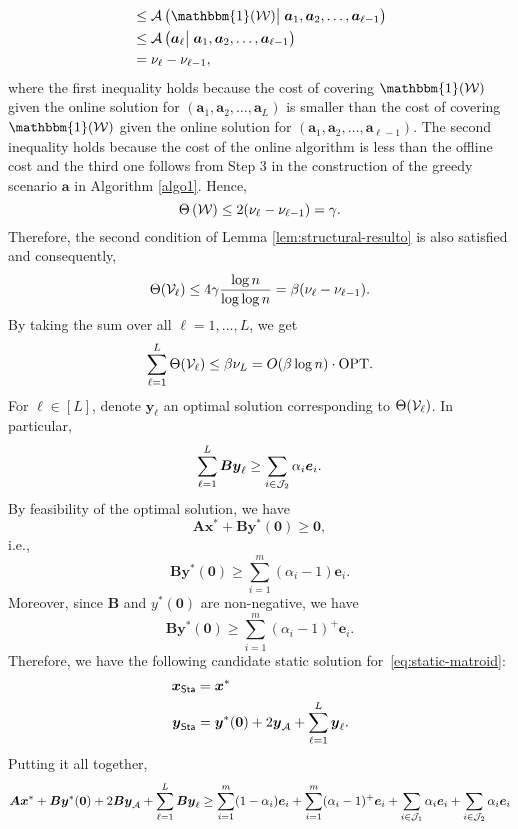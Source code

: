 \documentclass[moor]{informs1}              %
\newcommand{\opt}{\mathrm{OPT}}
\newcommand{\mb}[1]{\ensuremath{\boldsymbol{#1}}}
\begin{document}
{\begin{align*}
&\leq { {\cal A} }\left( \mathbbm{1}({\cal W})  \big\vert \; \mb a_1, \mb a_2, \ldots , \mb a_{\ell-1} \right) \\
&\leq { {\cal A} }\left( \mb  a_{\ell}  \big\vert \; \mb a_1, \mb a_2, \ldots , \mb a_{\ell-1} \right) \\
&={\nu}_{\ell}- {\nu}_{\ell-1} , 
\end{align*}
where the first inequality holds because the  cost of covering $\mathbbm{1}({\cal W})$ given the online solution for $( \mb a_1, \mb a_2, \ldots , \mb a_{L})$ is 
smaller than the cost of covering $\mathbbm{1}({\cal W})$ given the online solution for $(\mb a_1, \mb a_2, \ldots , \mb a_{\ell-1})$. The second inequality holds because the cost of the online algorithm is less than the offline cost and the third one follows from Step 3 in the construction of the greedy scenario $ \mb a$ in Algorithm \ref{algo1}. Hence,
$$  \Theta \left( {\cal W}\right) \leq 2 ({\nu}_{\ell}- {\nu}_{\ell-1} )  = \gamma .$$
Therefore,  the second condition of Lemma \ref{lem:structural-resulto} is also satisfied and consequently,
$$ \Theta({\cal V}_{\ell}) \leq  4 \gamma \frac{\log n}{\log \log n}  =        \beta   ( {\nu}_{\ell}- {\nu}_{\ell-1}).$$
By taking the sum over all $\ell=1,\ldots,L$, we get
$$ \sum_{\ell=1}^L \Theta({\cal V}_{\ell}) \leq \beta {\nu}_L = O(\beta  \log n ) \cdot  \opt.$$
For $\ell \in [L]$, denote $\mb y_{\ell}$ an optimal solution corresponding to $\Theta({\cal V}_{\ell})$. In particular,
$$ \sum_{\ell=1}^L \mb B \mb y_{\ell} \geq \sum_{i \in {\cal J}_2} \alpha_i \mb e_i.$$
By feasibility of the optimal solution, we have
$$ \mb A \mb x^*+ \mb B \mb y^*(\mb 0) \geq \mb 0,$$
i.e.,
$$ \mb B \mb y^*(\mb 0) \geq \sum_{ i=1}^m (\alpha_i -1) \mb e_i.$$
Moreover, since $\mb B$ and $y^*(\mb 0) $ are non-negative, we have
$$ \mb B \mb y^*(\mb 0) \geq \sum_{ i=1}^m (\alpha_i -1)^+ \mb e_i.$$
Therefore, we have the following candidate static solution for~\eqref{eq:static-matroid}:
\begin{align*}
\mb x_{\sf Sta} & = \mb x^* \\
\mb y_{\sf Sta} & = \mb y^*(\mb 0) + 2 \mb y_{\cal A} + \sum_{\ell =1}^L \mb y_{\ell}.
\end{align*}
Putting it all together,
\begin{align*}
\mb A \mb x^* + \mb B\mb y^*(\mb 0)+ 2\mb B \mb y_{\cal A}+ \sum_{\ell=1}^L \mb B \mb y_{\ell} &\geq \sum_{i=1}^m (1-\alpha_i) \mb e_i + \sum_{ i=1}^m (\alpha_i -1)^+ \mb e_i + \sum_{i \in {\cal J}_{1} } \alpha_i \mb e_i+\sum_{i \in {\cal J}_{2} } \alpha_i \mb e_i \\

\end{align*}}
\end{document}
